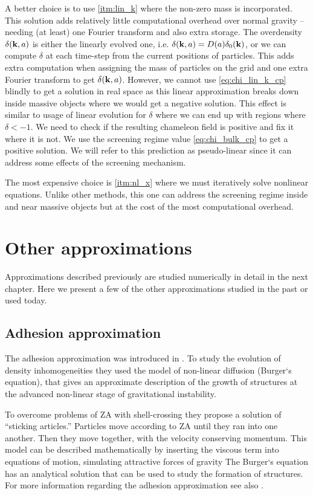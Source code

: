 A better choice is to use \ref{itm:lin_k} where the non-zero mass is incorporated. This solution adds relatively little computational overhead over normal gravity -- needing (at least) one Fourier transform and also extra storage. The overdensity $\delta(\mathbf k, a)$ is either the linearly evolved one, i.e. $\delta(\mathbf k, a) = D(a)\delta_0(\mathbf k)$, or we can compute $\delta$ at each time-step from the current positions of particles. This adds extra computation when assigning the mass of particles on the grid and one extra Fourier transform to get $\delta(\mathbf k, a)$. 
However, we cannot use \eqref{eq:chi_lin_k_cp} blindly to get a solution in real space as this linear approximation breaks down inside massive objects where we would get a negative solution. This effect is similar to usage of linear evolution for $\delta$ where we can end up with regions where $\delta<-1$. We need to check if the resulting chameleon field is positive and fix it where it is not. We use the screening regime value \eqref{eq:chi_bulk_cp} to get a positive solution. We will refer to this prediction as pseudo-linear since it can address some effects of the screening mechanism.

The most expensive choice is \ref{itm:nl_x} where we must iteratively solve nonlinear equations. Unlike other methods, this one can address the screening regime inside and near massive objects but at the cost of the most computational overhead.

\section{Other approximations}
Approximations described previously are studied numerically in detail in the next chapter. Here we present a few of the other approximations studied in the past or used today.

\subsection{Adhesion approximation}
The adhesion approximation was introduced in \textcite{1989MNRAS.236..385G}. To study the evolution of density inhomogeneities they used the model of non-linear diffusion (Burger`s equation), that gives an approximate description of the growth of structures at the advanced non-linear stage of gravitational instability.

To overcome problems of ZA with shell-crossing they propose a solution of ``sticking articles.'' Particles move according to ZA until they ran into one another. Then they move together, with the velocity conserving momentum. This model can be described mathematically by inserting the viscous term into equations of motion, simulating attractive forces of gravity
The Burger`s equation has an analytical solution that can be used to study the formation of structures. For more information regarding the adhesion approximation see  also \textcite{1990MNRAS.247..260W,1994ApJ...428...28M}.

